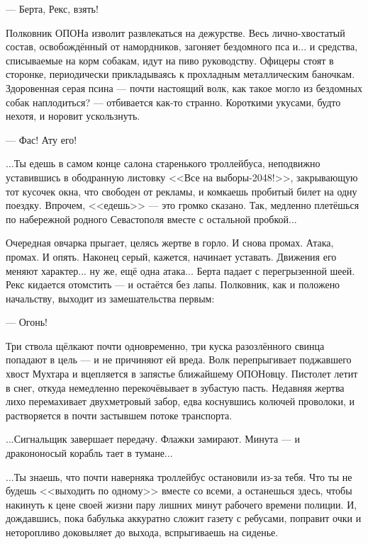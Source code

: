 --- Берта, Рекс, взять!

Полковник ОПОНа изволит развлекаться на дежурстве.
Весь лично-хвостатый состав, освобождённый от намордников, загоняет бездомного пса и...
и средства, списываемые на корм собакам, идут на пиво руководству.
Офицеры стоят в сторонке, периодически прикладываясь к прохладным металлическим баночкам.
Здоровенная серая псина --- почти настоящий волк, как такое могло из бездомных собак наплодиться? ---
отбивается как-то странно. Короткими укусами, будто нехотя, и норовит ускользнуть.

--- Фас! Ату его!

\emptypar

...Ты едешь в самом конце салона старенького троллейбуса,
неподвижно уставившись в ободранную листовку <<Все на выборы-2048!>>, закрывающую тот кусочек окна, что свободен от рекламы,
и комкаешь пробитый билет на одну поездку. Впрочем, <<едешь>> --- это громко сказано.
Так, медленно плетёшься по набережной родного Севастополя вместе с остальной пробкой...

\emptypar

Очередная овчарка прыгает, целясь жертве в горло. И снова промах. Атака, промах. И опять.
Наконец серый, кажется, начинает уставать. Движения его меняют характер... ну же, ещё одна атака...
Берта падает с перегрызенной шеей. Рекс кидается отомстить --- и остаётся без лапы.
Полковник, как и положено начальству, выходит из замешательства первым:

--- Огонь!

Три ствола щёлкают почти одновременно, три куска разозлённого свинца попадают в цель --- и не причиняют ей вреда.
Волк перепрыгивает поджавшего хвост Мухтара и вцепляется в запястье ближайшему ОПОНовцу.
Пистолет летит в снег, откуда немедленно перекочёвывает в зубастую пасть.
Недавняя жертва лихо перемахивает двухметровый забор, едва коснувшись колючей проволоки,
и растворяется в почти застывшем потоке транспорта.

\emptypar

...Сигнальщик завершает передачу. Флажки замирают. Минута --- и дракононосый корабль тает в тумане...

\emptypar

...Ты знаешь, что почти наверняка троллейбус остановили из-за тебя.
Что ты не будешь <<выходить по одному>> вместе со всеми, а останешься здесь,
чтобы накинуть к цене своей жизни пару лишних минут рабочего времени полиции.
И, дождавшись, пока бабулька аккуратно сложит газету с ребусами, поправит очки и неторопливо доковыляет до выхода,
вспрыгиваешь на сиденье.

